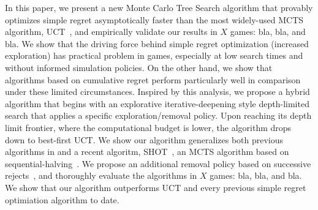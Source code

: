 \documentclass[runningheads,a4paper]{llncs}
\begin{document}
In this paper, we present a new Monte Carlo Tree Search algorithm that provably optimizes simple regret 
asymptotically faster than the most widely-used MCTS algorithm, UCT~\cite{UCT}, and empirically validate 
our results in $X$ games: bla, bla, and bla. 
We show that the driving force behind simple regret optimization (increased exploration) has practical 
problem in games, especially at low search times and without informed simulation policies. On the other hand, 
we show that algorithms based on cumulative regret perform particularly well in comparison under these 
limited circumstances. 
Inspired by this analysis, we propose a hybrid algorithm that begins with an explorative iterative-deepening 
style depth-limited search that applies a specific exploration/removal policy. 
Upon reaching its depth limit frontier, where the computational budget is lower, the algorithm drops 
down to best-first UCT. 
We show our algorithm generalizes both previous algorithms in \cite{Tolpin12MCTSSR} and a recent algoritm, 
SHOT~\cite{Cazenave14SHOT}, an MCTS algorithm based on sequential-halving~\cite{Karnin13SH}. We propose an 
additional removal policy based on successive rejects~\cite{Audibert10Best}, and thoroughly evaluate the
algorithms in $X$ games: bla, bla, and bla. We show that our algorithm outperforms UCT and every previous 
simple regret optimiation algorithm to date. 






\end{document}
